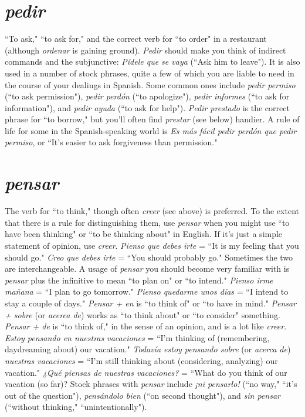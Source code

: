 \section{\emph{pedir}}

``To ask," ``to ask for," and the correct verb for ``to order" in
a restaurant (although \emph{ordenar} is gaining ground). \emph{Pedir} should make
you think of indirect commands and the subjunctive: \emph{Pídele que se
	vaya} (``Ask him to leave"). It is also used in a number of stock phrases,
quite a few of which you are liable to need in the course of your dealings in Spanish. Some common ones include \emph{pedir permiso} (``to ask
permission"), \emph{pedir perdón} (``to apologize"), \emph{pedir informes} (``to ask for
information"), and \emph{pedir ayuda} (``to ask for help"). \emph{Pedir prestado} is
the correct phrase for ``to borrow," but you'll often find \emph{prestar} (see below) handier. A rule of life for some in the Spanish-speaking world is
\emph{Es más fácil pedir perdón que pedir permiso}, or ``It's easier to ask forgiveness than permission."

\section{\emph{pensar}}

The verb for ``to think," though often \emph{creer} (see above) is preferred. To the extent that there is a rule for distinguishing them, use
\emph{pensar} when you might use ``to have been thinking" or ``to be thinking
about" in English. If it's just a simple statement of opinion, use \emph{creer}.
\emph{Pienso que debes irte} = ``It is my feeling that you should go." \emph{Creo
	que debes irte} = ``You should probably go." Sometimes the two are
interchangeable. A usage of \emph{pensar} you should become very familiar
with is \emph{pensar} plus the infinitive to mean ``to plan on" or ``to intend."
\emph{Pienso irme mañana} = ``I plan to go tomorrow." \emph{Pienso quedarme
	unos días} = ``I intend to stay a couple of days." \emph{Pensar + en} is ``to
think of" or ``to have in mind." \emph{Pensar + sobre} (or \emph{acerca de}) works as
``to think about" or ``to consider" something. \emph{Pensar + de} is ``to think
of," in the sense of an opinion, and is a lot like \emph{creer}. \emph{Estoy pensando en nuestras vacaciones}
= ``I'm thinking of (remembering, daydreaming about) our vacation." \emph{Todavía estoy pensando sobre} (or \emph{acerca de})
\emph{nuestras vacaciones} = ``I'm still thinking about (considering, analyzing) our vacation." \emph{¿Qué piensas de nuestras vacaciones?} = ``What do
you think of our vacation (so far)? Stock phrases with \emph{pensar} include
\emph{¡ni pensarlo!} (``no way," ``it's out of the question"), \emph{pensándolo bien}
(``on second thought"), and \emph{sin pensar} (``without thinking,"
``unintentionally").

